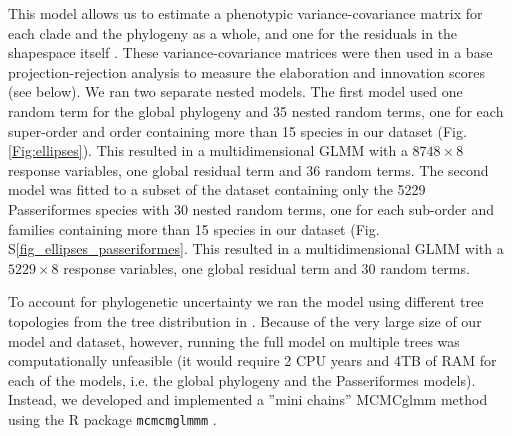 \documentclass[12pt,letterpaper]{article}
\begin{document}
This model allows us to estimate a phenotypic variance-covariance matrix for each clade and the phylogeny as a whole, and one for the residuals in the shapespace itself \cite{robinson2013quantifying}.
These variance-covariance matrices were then used in a base projection-rejection analysis to measure the elaboration and innovation scores (see below).
We ran two separate nested models.
The first model used one random term for the global phylogeny and 35 nested random terms, one for each super-order and order containing more than 15 species in our dataset (Fig. \ref{Fig:ellipses}).
This resulted in a multidimensional GLMM with a $8748 \times 8$ response variables, one global residual term and 36 random terms.
The second model was fitted to a subset of the dataset containing only the 5229 Passeriformes species with 30 nested random terms, one for each sub-order and families containing more than 15 species in our dataset (Fig. S\ref{fig_ellipses_passeriformes}.
This resulted in a multidimensional GLMM with a $5229 \times 8$ response variables, one global residual term and 30 random terms.
 
To account for phylogenetic uncertainty we ran the model using different tree topologies from the tree distribution in \cite{jetz2012global}.
Because of the very large size of our model and dataset, however, running the full model on multiple trees was computationally unfeasible (it would require 2 CPU years and 4TB of RAM for each of the models, i.e. the global phylogeny and the Passeriformes models).
Instead, we developed and implemented a ''mini chains'' MCMCglmm method using the R package \texttt{mcmcmglmmm} \cite{mcmcmcglmmm}.
\end{document}
